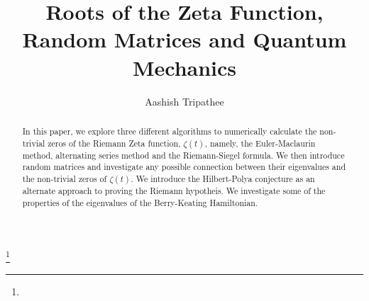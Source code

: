 \documentclass{amsproc}
\theoremstyle{definition}
\theoremstyle{remark}
\numberwithin{equation}{section}
\begin{document}
\title{Roots of the Zeta Function, Random Matrices and Quantum Mechanics}


\author{Aashish Tripathee}
\address{}
\curraddr{}
\thanks{}





\date{}

\begin{abstract}
In this paper, we explore three different algorithms to numerically calculate the non-trivial zeros of the Riemann Zeta function, $\zeta(t)$, namely, the Euler-Maclaurin method, alternating series method and the Riemann-Siegel formula. We then introduce random matrices and investigate any possible connection between their eigenvalues and the non-trivial zeros of $\zeta(t)$. We introduce the Hilbert-Polya conjecture as an alternate approach to proving the Riemann hypotheis. We investigate some of the properties of the eigenvalues of the Berry-Keating Hamiltonian.
\end{abstract}



\maketitle





\end{document}
